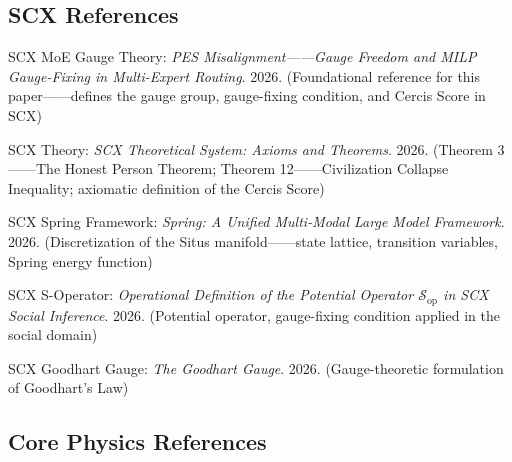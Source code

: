 \documentclass[12pt,a4paper]{article}
\theoremstyle{remark}
\newcommand{\Sop}{\mathcal{S}_{\text{op}}}
\begin{document}
\subsection*{SCX References}

\begin{enumerate}[label={[S\arabic*]}]
    \item SCX MoE Gauge Theory: \textit{PES Misalignment——Gauge Freedom and MILP Gauge-Fixing in Multi-Expert Routing}.
    2026. (Foundational reference for this paper——defines the gauge group, gauge-fixing condition, and Cercis Score in SCX)

    \item SCX Theory: \textit{SCX Theoretical System: Axioms and Theorems}. 2026.
    (Theorem 3——The Honest Person Theorem; Theorem 12——Civilization Collapse Inequality; axiomatic definition of the Cercis Score)

    \item SCX Spring Framework: \textit{Spring: A Unified Multi-Modal Large Model Framework}. 2026.
    (Discretization of the Situs manifold——state lattice, transition variables, Spring energy function)

    \item SCX S-Operator: \textit{Operational Definition of the Potential Operator $\Sop$ in SCX Social Inference}. 2026.
    (Potential operator, gauge-fixing condition applied in the social domain)

    \item SCX Goodhart Gauge: \textit{The Goodhart Gauge}. 2026.
    (Gauge-theoretic formulation of Goodhart's Law)
\end{enumerate}

\subsection*{Core Physics References}
\end{document}
